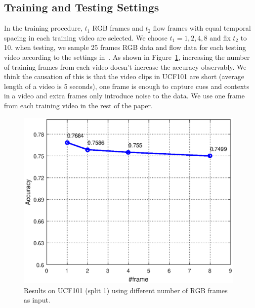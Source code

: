 \documentclass[10pt,twocolumn,letterpaper]{article}
\begin{document}
\subsection{Training and Testing Settings}
In the training procedure, $t_{1}$ RGB frames and $t_{2}$ flow frames with equal temporal spacing in each training video are selected. We choose $t_{1}={1,2,4,8}$ and fix $t_{2}$ to 10. when testing, we sample 25 frames RGB data and flow data for each testing video according to the settings in~\cite{simonyan2014two}. As shown in Figure~\ref{num_frames_accu}, increasing the number of training frames from each video doesn't increase the accuracy observably. We think the causation of this is that the video clips in UCF101 are short (average length of a video is 5 seconds), one frame is enough to capture cues and contexts in a video and extra frames only introduce noise to the data. We use one frame from each training video in the rest of the paper. 
\begin{figure}
	\begin{center}
		\includegraphics[scale=0.5]{imgs/num_frames_accu.eps}
		\caption{Results on UCF101 (split 1) using different number of RGB frames as input.}
		\label{num_frames_accu}
	\end{center}
\end{figure}
\end{document}
